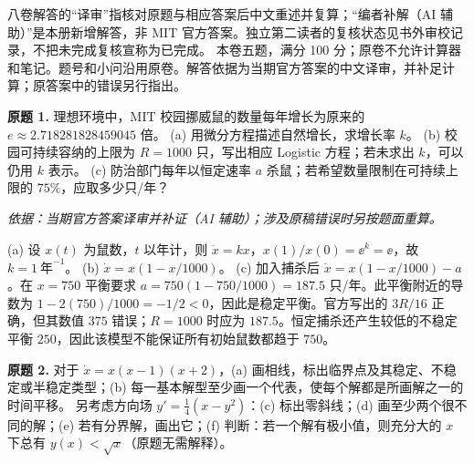 八卷解答的“译审”指核对原题与相应答案后中文重述并复算；“编者补解（AI 辅助）”是本册新增解答，非 MIT 官方答案。独立第二读者的复核状态见书外审校记录，不把未完成复核宣称为已完成。
本卷五题，满分 100 分；原卷不允许计算器和笔记。题号和小问沿用原卷。解答依据为当期官方答案的中文译审，并补足计算；原答案中的错误另行指出。
\begin{exercise}\label{cw:ex1-1}\textbf{原题 1.} 理想环境中，MIT 校园挪威鼠的数量每年增长为原来的 $e\approx2.718281828459045$ 倍。
(a) 用微分方程描述自然增长，求增长率 $k$。
(b) 校园可持续容纳的上限为 $R=1000$ 只，写出相应 Logistic 方程；若未求出 $k$，可以仍用 $k$ 表示。
(c) 防治部门每年以恒定速率 $a$ 杀鼠；若希望数量限制在可持续上限的 $75\%$，应取多少只/年？
\end{exercise}
\begin{solution}
\textit{依据：当期官方答案译审并补证（AI 辅助）；涉及原稿错误时另按题面重算。}\par
(a) 设 $x(t)$ 为鼠数，$t$ 以年计，则 $\dot x=kx$，$x(1)/x(0)=\ee^k=\ee$，故 $k=1\ \text{年}^{-1}$。
(b) $\dot x=x(1-x/1000)$。
(c) 加入捕杀后 $\dot x=x(1-x/1000)-a$。在 $x=750$ 平衡要求 $a=750(1-750/1000)=187.5$ 只/年。此平衡附近的导数为 $1-2(750)/1000=-1/2<0$，因此是稳定平衡。官方写出的 $3R/16$ 正确，但其数值 $375$ 错误；$R=1000$ 时应为 $187.5$。恒定捕杀还产生较低的不稳定平衡 $250$，因此该模型不能保证所有初始鼠数都趋于 $750$。
\end{solution}
\begin{exercise}\label{cw:ex1-2}\textbf{原题 2.}
对于 $\dot x=x(x-1)(x+2)$，(a) 画相线，标出临界点及其稳定、不稳定或半稳定类型；(b) 每一基本解型至少画一个代表，使每个解都是所画解之一的时间平移。
另考虑方向场 $y'=\tfrac14(x-y^2)$：(c) 标出零斜线；(d) 画至少两个很不同的解；(e) 若有分界解，画出它；(f) 判断：若一个解有极小值，则充分大的 $x$ 下总有 $y(x)<\sqrt x$（原题无需解释）。
\end{exercise}
